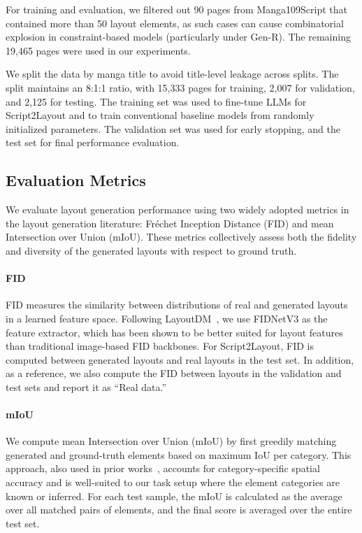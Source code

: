 For training and evaluation, we filtered out 90 pages from Manga109Script that contained more than 50 layout elements, as such cases can cause combinatorial explosion in constraint-based models (particularly under Gen-R). The remaining 19,465 pages were used in our experiments.

We split the data by manga title to avoid title-level leakage across splits. The split maintains an 8:1:1 ratio, with 15,333 pages for training, 2,007 for validation, and 2,125 for testing. The training set was used to fine-tune LLMs for Script2Layout and to train conventional baseline models from randomly initialized parameters. The validation set was used for early stopping, and the test set for final performance evaluation.

\subsection{Evaluation Metrics}
\vspace{-0.5em}
We evaluate layout generation performance using two widely adopted metrics in the layout generation literature: Fréchet Inception Distance (FID) and mean Intersection over Union (mIoU). These metrics collectively assess both the fidelity and diversity of the generated layouts with respect to ground truth.

\vspace{-0.5em}
\paragraph{FID}
FID measures the similarity between distributions of real and generated layouts in a learned feature space. Following LayoutDM~\cite{inoue2023layoutdm}, we use FIDNetV3 as the feature extractor, which has been shown to be better suited for layout features than traditional image-based FID backbones. For Script2Layout, FID is computed between generated layouts and real layouts in the test set. In addition, as a reference, we also compute the FID between layouts in the validation and test sets and report it as “Real data.”

\vspace{-0.5em}
\paragraph{mIoU}
We compute mean Intersection over Union (mIoU) by first greedily matching generated and ground-truth elements based on maximum IoU per category. This approach, also used in prior works~\cite{inoue2023layoutdm}, accounts for category-specific spatial accuracy and is well-suited to our task setup where the element categories are known or inferred. For each test sample, the mIoU is calculated as the average over all matched pairs of elements, and the final score is averaged over the entire test set.

